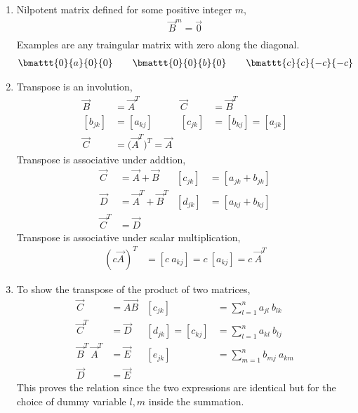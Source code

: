 \begin{enumerate}
    \item Nilpotent matrix defined for some positive integer $ m $,
          \begin{align}
              \vec{B}^m = \vec{0} \\
          \end{align}
          Examples are any traingular matrix with zero along the diagonal.
          \begin{align}
              \bmattt{0}{a}{0}{0} \qquad \bmattt{0}{0}{b}{0} \qquad
              \bmattt{c}{c}{-c}{-c}
          \end{align}

    \item Transpose is an involution,
          \begin{align}
              \vec{B}  & = \vec{A}^T                         &
              \vec{C}  & = \vec{B}^T                           \\
              [b_{jk}] & = [a_{kj}]                          &
              [c_{jk}] & = [b_{kj}] = [a_{jk}]                 \\
              \vec{C}  & = \Big( \vec{A}^T \Big)^T = \vec{A}
          \end{align}
          Transpose is associative under addtion,
          \begin{align}
              \vec{C}   & = \vec{A} + \vec{B}     &
              [c_{jk}]  & = [a_{jk} + b_{jk}]       \\
              \vec{D}   & = \vec{A}^T + \vec{B}^T &
              [d_{jk}]  & = [a_{kj} + b_{kj}]       \\
              \vec{C}^T & = \vec{D}
          \end{align}
          Transpose is associative under scalar multiplication,
          \begin{align}
              (c\vec{A})^T & = [c\ a_{kj}] = c\ [a_{kj}] = c\ \vec{A}^T
          \end{align}

    \item To show the transpose of the product of two matrices,
          \begin{align}
              \vec{C}              & = \vec{AB}                      &
              [c_{jk}]
                                   & = \sum_{l=1}^{n} a_{jl}\ b_{lk}   \\
              \vec{C}^T            & = \vec{D}                       &
              [d_{jk}] = [c_{kj}]
                                   & = \sum_{l=1}^{n} a_{kl}\ b_{lj}   \\
              \vec{B}^T\ \vec{A}^T & = \vec{E}                       &
              [e_{jk}]             & = \sum_{m=1}^{n} b_{mj}\ a_{km}   \\
              \vec{D}              & = \vec{E}                       &
          \end{align}
          This proves the relation since the two expressions are identical but for the
          choice of dummy variable $ l,m $ inside the summation.


\end{enumerate}
